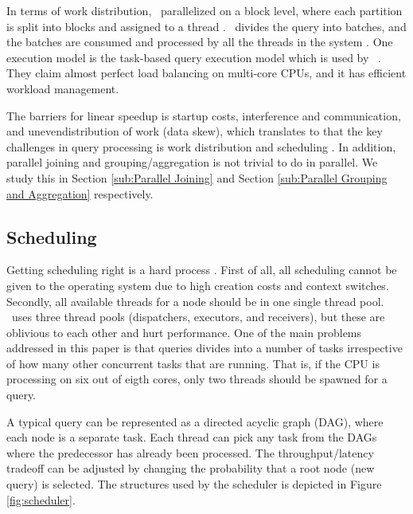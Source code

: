 In terms of work distribution, \blink~parallelized on a block level, where each partition is split into blocks and assigned to a thread \cite{Johnson2008-cp, Barber2012-xt}. \mssql~divides the query into batches, and the batches are consumed and processed by all the threads in the system \cite{Larson2013-mc}. One execution model is the task-based query execution model which is used by \hyrise~\cite{Swhalb2014-hn}. They claim almost perfect load balancing on multi-core CPUs, and it has efficient workload management.

The barriers for linear speedup is startup costs, interference and communication, and unevendistribution of work (data skew)\cite{DeWitt1992-ki}, which translates to that the key challenges in query processing is work distribution and scheduling \cite{Neumann2011-uq}. In addition, parallel joining and grouping/aggregation is not trivial to do in parallel. We study this in Section \ref{sub:Parallel Joining} and Section \ref{sub:Parallel Grouping and Aggregation} respectively.

\subsection{Scheduling}
\label{sub:Scheduling}
Getting scheduling right is a hard process \cite{Psaroudakis2013-fn}. First of all, all scheduling cannot be given to the operating system due to high creation costs and context switches. Secondly, all available threads for a node should be in one single thread pool. \oracle~uses three thread pools (dispatchers, executors, and receivers), but these are oblivious to each other and hurt performance. One of the main problems addressed in this paper is that queries divides into a number of tasks irrespective of how many other concurrent tasks that are running. That is, if the CPU is processing on six out of eigth cores, only two threads should be spawned for a query.

A typical query can be represented as a directed acyclic graph (DAG), where each node is a separate task. Each thread can pick any task from the DAGs where the predecessor has already been processed. The throughput/latency tradeoff can be adjusted by changing the probability that a root node (new query) is selected. The structures used by the scheduler is depicted in Figure \ref{fig:scheduler}.

